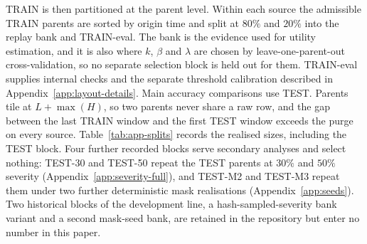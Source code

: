 \documentclass{article}
\begin{document}
TRAIN is then partitioned at the parent level. Within each source the admissible TRAIN parents
are sorted by origin time and split at $80\%$ and $20\%$ into the replay bank and TRAIN-eval. The bank is
the evidence used for utility estimation, and it is also where $k$, $\beta$ and $\lambda$ are chosen by
leave-one-parent-out cross-validation, so no separate selection block is held out for them.
TRAIN-eval supplies internal checks and the separate threshold calibration described in
Appendix~\ref{app:layout-details}. Main accuracy comparisons use TEST. Parents tile at $L + \max(H)$, so two
parents never share a raw row, and the gap between the last TRAIN window and the first TEST
window exceeds the purge on every source.
Table~\ref{tab:app-splits} records the realised sizes, including the TEST block.
Four further recorded blocks serve secondary analyses and select nothing: TEST-30 and
TEST-50 repeat the TEST parents at $30\%$ and $50\%$ severity
(Appendix~\ref{app:severity-full}), and TEST-M2 and TEST-M3 repeat them under two further
deterministic mask realisations (Appendix~\ref{app:seeds}). Two historical blocks of the
development line, a hash-sampled-severity bank variant and a second mask-seed bank, are
retained in the repository but enter no number in this paper.

\begin{table}[!t]
  \caption{Realised split sizes. Counts are of admissible parents and not of correlated mask
variants. A parent with several patterns or severities remains one cluster for resampling.
TEST is the evaluation population for every table in the main
  text, and it is disjoint from both TRAIN blocks.}
  \label{tab:app-splits}
  \centering
  \small
  \setlength{\tabcolsep}{4pt}
\end{table}
\end{document}
